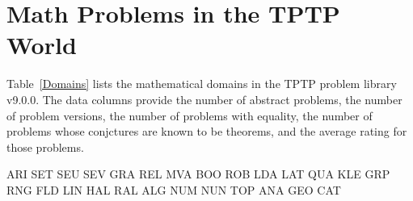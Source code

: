 \documentclass[runningheads]{llncs}
\begin{document}
\section{Math Problems in the TPTP World}
\label{MathProblems}

Table~\ref{Domains} lists the mathematical domains in the TPTP problem library v9.0.0.
The data columns provide the number of abstract problems, the number of problem versions, the
number of problems with equality, the number of problems whose conjctures are known to be
theorems, and the average rating for those problems.

ARI SET SEU SEV GRA REL MVA BOO ROB LDA LAT QUA KLE GRP RNG FLD LIN HAL RAL ALG NUM NUN TOP ANA GEO CAT
\end{document}
